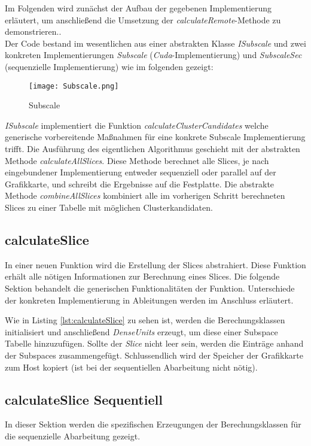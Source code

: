 Im Folgenden wird zunächst der Aufbau der gegebenen Implementierung erläutert, um anschließend die Umsetzung der
\emph{calculateRemote}-Methode zu demonstrieren..\\
Der Code bestand im wesentlichen aus einer abstrakten Klasse \emph{ISubscale} und zwei konkreten Implementierungen
\emph{Subscale} (\emph{Cuda}-Implementierung) und \emph{SubscaleSec} (sequenzielle Implementierung) wie im folgenden
gezeigt:
\newpage
\begin{figure}[h]
    \centering
    \texttt{[image: Subscale.png]}
    \caption{Subscale}
    \label{img:subscale}
\end{figure}

\emph{ISubscale} implementiert die Funktion \emph{calculateClusterCandidates} welche generische vorbereitende Maßnahmen
für eine konkrete Subscale Implementierung trifft. Die Ausführung des eigentlichen Algorithmus geschieht mit der
abstrakten Methode \emph{calculateAllSlices}. Diese Methode berechnet alle Slices, je nach eingebundener Implementierung
entweder sequenziell oder parallel auf der Grafikkarte, und schreibt die Ergebnisse auf die Festplatte. Die abstrakte
Methode \emph{combineAllSlices} kombiniert alle im vorherigen Schritt berechneten Slices zu einer Tabelle mit möglichen
Clusterkandidaten.

\subsection{calculateSlice}
In einer neuen Funktion wird die Erstellung der Slices abstrahiert. Diese Funktion erhält alle nötigen Informationen
zur Berechnung eines Slices. Die folgende Sektion behandelt die generischen Funktionalitäten der Funktion. Unterschiede
der konkreten Implementierung in Ableitungen werden im Anschluss erläutert.



Wie in Listing \ref{lst:calculateSlice} zu sehen ist, werden die Berechungsklassen initialisiert und anschließend
\emph{DenseUnits} erzeugt, um diese einer Subspace Tabelle hinzuzufügen. Sollte der \emph{Slice} nicht leer sein,
werden die Einträge anhand der Subspaces zusammengefügt. Schlussendlich wird der Speicher der Grafikkarte zum Host
kopiert (ist bei der sequentiellen Abarbeitung nicht nötig).

\subsection{calculateSlice Sequentiell}
In dieser Sektion werden die spezifischen Erzeugungen der Berechungsklassen für die sequenzielle Abarbeitung gezeigt.

